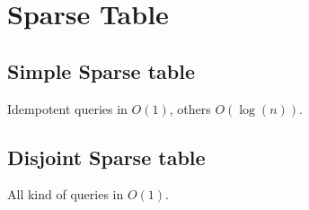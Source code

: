\section{Sparse Table}

\subsection{Simple Sparse table}
Idempotent queries in $O(1)$, others $O(\log (n))$.
\subsection{Disjoint Sparse table}
All kind of queries in $O(1)$.
